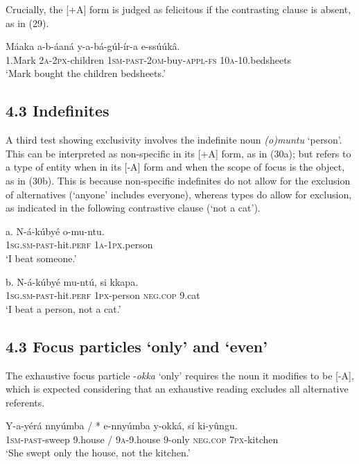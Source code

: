 \documentclass[output=paper]{langsci/langscibook}
\begin{document}
Crucially, the [+A] form is judged as felicitous if the contrasting clause is absent, as in (29).

\ea
\gll   Máaka  a-b-áaná    y-a-bá-gúl-ír-a      e-ssúúkâ.\\
       1.Mark  \textsc{2a}{}-\textsc{2px}{}-children  \textsc{1sm}{}-\textsc{past}{}-\textsc{2om}{}-buy-\textsc{appl}{}-\textsc{fs}  \textsc{10a}{}-10.bedsheets\\
\glt   ‘Mark bought the children bedsheets.’
\z

\subsection{4.3 Indefinites}

A third test showing exclusivity involves the indefinite noun \textit{(o)muntu} ‘person’. This can be interpreted as non-specific in its [+A] form, as in (30a); but refers to a type of entity when in its [-A] form and when the scope of focus is the object, as in (30b). This is because non-specific indefinites do not allow for the exclusion of alternatives (‘anyone’ includes everyone), whereas types do allow for exclusion, as indicated in the following contrastive clause (‘not a cat’).

\ea
\gll   a.  N-á-kúbyé      o-mu-ntu.\\
         \textsc{1sg}.\textsc{sm}{}-\textsc{past}{}-hit.\textsc{perf}  \textsc{1a}{}-\textsc{1px}.person\\
\glt     ‘I beat someone.’
\z

\ea
\gll   b.  N-á-kúbyé      mu-ntú,  si    kkapa.\\
         \textsc{1sg}.\textsc{sm}{}-\textsc{past}{}-hit.\textsc{perf}  \textsc{1px}{}-person  \textsc{neg.cop}  9.cat\\
\glt     ‘I beat a person, not a cat.’
\z

\subsection{4.3 Focus particles ‘only’ and ‘even’}

The exhaustive focus particle -\textit{okka} ‘only’ requires the noun it modifies to be [-A], which is expected considering that an exhaustive reading excludes all alternative referents.

\ea
\gll   Y-a-yérá    nnyúmba /  * e-nnyúmba  y-okká,  sí    ki-yûngu.\\
       \textsc{1sm}{}-\textsc{past}{}-sweep  9.house /  \textsc{9a}{}-9.house  9-only\textsc{  neg}.\textsc{cop}  \textsc{7px}{}-kitchen\\
\glt ‘She swept only the house, not the kitchen.’
\z
\end{document}
